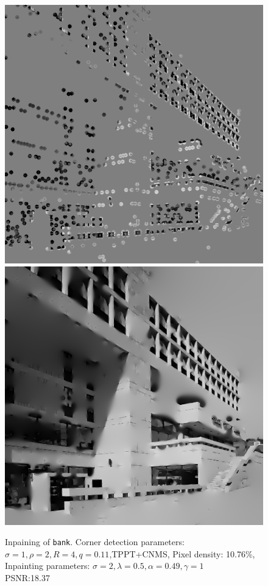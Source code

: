 \begin{figure}[htpb]
    \centering
    \includegraphics[width=0.4\linewidth]{../Images/bank/bankr2m4mask.png}
    \includegraphics[width=0.4\linewidth]{../Images/bank/bankr2m4inpaint.png}\\\vspace{0.2cm}
    \caption{Inpaining of \texttt{bank}. Corner detection parameters:
        $\sigma=1,\rho=2,R=4,q=0.11$,TPPT+CNMS,
    Pixel density: 10.76\%, Inpainting parameters: $\sigma=2,\lambda=0.5,\alpha=0.49,\gamma=1$\\
PSNR:\@18.37}\label{fig:BankEx}
\end{figure}


